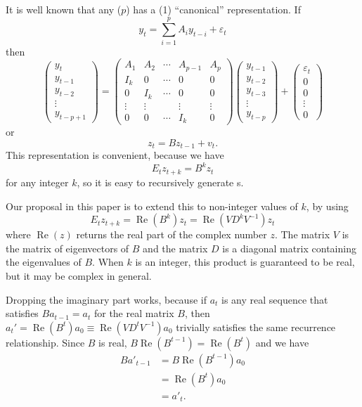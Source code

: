 \documentclass[12pt,fleqn]{article}
\renewcommand{\Re}{\operatorname{Re}}
\newcommand{\vep}{\varepsilon}
\begin{document}
It is well known that any \VAR($p$) has a \VAR(1) ``canonical''
representation. If
\[
y_t = \sum_{i=1}^p A_i y_{t-i} + \vep_t
\]
then
\[
\begin{pmatrix}
  y_t \\ y_{t-1} \\ y_{t-2} \\ \vdots \\ y_{t-p+1}
\end{pmatrix}
=
\begin{pmatrix}
  A_1 & A_2 & \cdots & A_{p-1} & A_p \\
  I_k & 0   & \cdots & 0 & 0 \\
  0  & I_k  & \cdots & 0 & 0 \\
  \vdots & \vdots & & \vdots & \vdots \\
  0 & 0 & \cdots & I_k & 0 
\end{pmatrix}
\begin{pmatrix}
  y_{t-1} \\ y_{t-2} \\ y_{t-3} \\ \vdots \\ y_{t-p}
\end{pmatrix}
+
\begin{pmatrix}
  \vep_{t} \\ 0 \\ 0 \\ \vdots \\ 0
\end{pmatrix}
\]
or
\[
z_t = B z_{t-1} + v_t.
\]
This representation is convenient, because we have
\[
E_t z_{t+k} = B^k z_{t}
\]
for any integer $k$, so it is easy to recursively generate \IRF s.

Our proposal in this paper is to extend this to non-integer values of
$k$, by using
\[
E_t z_{t+k} = \Re(B^k) z_{t} = \Re(V D^k V^{-1}) z_t
\]
where $\Re(z)$ returns the real part of the complex number $z$. The
matrix $V$ is the matrix of eigenvectors of $B$ and the matrix $D$ is
a diagonal matrix containing the eigenvalues of $B$. When $k$ is an
integer, this product is guaranteed to be real, but it may be complex
in general.

Dropping the imaginary part works, because if $a_t$ is any real
sequence that satisfies $B a_{t-1} = a_t$ for the real matrix $B$,
then $a_t' = \Re(B^t) a_{0} \equiv \Re(V D^t V^{-1}) a_0$ trivially
satisfies the same recurrence relationship. Since $B$ is real, $B
\Re(B^{t-1}) = \Re(B^t)$ and we have
\begin{align*}
B a'_{t-1} &= B \Re(B^{t-1}) a_{0} \\
&= \Re(B^t) a_0 \\
&= a'_t.
\end{align*}
\end{document}
